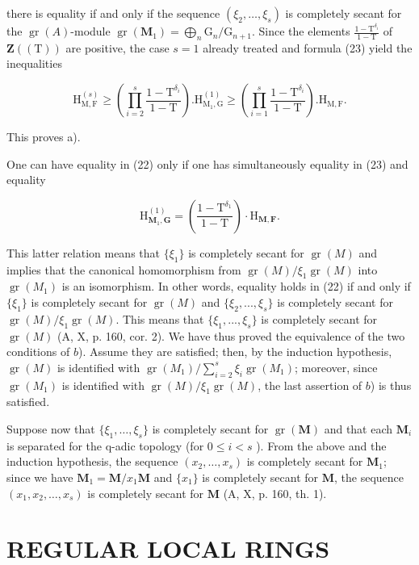 there is equality if and only if the sequence \((\xi_{2}, \ldots, \xi_{s})\) is completely secant for the \(\operatorname{gr}(A)\)-module \(\operatorname{gr}(\mathbf{M}_{1}) = \bigoplus_{n} \mathrm{G}_{n}/\mathrm{G}_{n+1}\). Since the elements \(\frac{1 - \mathrm{T}^{\delta_{i}}}{1 - \mathrm{T}}\) of \(\mathbf{Z}((\mathrm{T}))\) are positive, the case \(s = 1\) already treated and formula (23) yield the inequalities

\[
\mathrm{H} _ {\mathrm{M}, \mathrm{F}} ^ {(s)} \geqslant \left(\prod_ {i = 2} ^ {s} \frac {1 - \mathrm{T} ^ {\delta_ {i}}}{1 - \mathrm{T}}\right). \mathrm{H} _ {\mathrm{M} _ {1}, \mathrm{G}} ^ {(1)} \geqslant \left(\prod_ {i = 1} ^ {s} \frac {1 - \mathrm{T} ^ {\delta_ {i}}}{1 - \mathrm{T}}\right). \mathrm{H} _ {\mathrm{M}, \mathrm{F}}.\tag{24}
\]

This proves a).

One can have equality in (22) only if one has simultaneously equality in (23) and equality

\[
\mathrm{H} _ {\mathbf {M} _ {1}, \mathbf {G}} ^ {(1)} = \left(\frac {1 - \mathrm{T} ^ {\delta_ {1}}}{1 - \mathrm{T}}\right) \cdot \mathrm{H} _ {\mathbf {M}, \mathbf {F}}.\tag{25}
\]

This latter relation means that \(\{\xi_{1}\}\) is completely secant for \(\operatorname{gr}(M)\) and implies that the canonical homomorphism from \(\operatorname{gr}(M)/\xi_{1}\operatorname{gr}(M)\) into \(\operatorname{gr}(M_{1})\) is an isomorphism. In other words, equality holds in (22) if and only if \(\{\xi_{1}\}\) is completely secant for \(\operatorname{gr}(M)\) and \(\{\xi_{2}, ..., \xi_{s}\}\) is completely secant for \(\operatorname{gr}(M)/\xi_{1}\operatorname{gr}(M)\). This means that \(\{\xi_{1}, ..., \xi_{s}\}\) is completely secant for \(\operatorname{gr}(M)\) (A, X, p. 160, cor. 2). We have thus proved the equivalence of the two conditions of \(b\)). Assume they are satisfied; then, by the induction hypothesis, \(\operatorname{gr}(M)\) is identified with \(\operatorname{gr}(M_{1})/\sum_{i=2}^{s} \xi_{i}\operatorname{gr}(M_{1})\); moreover, since \(\operatorname{gr}(M_{1})\) is identified with \(\operatorname{gr}(M)/\xi_{1}\operatorname{gr}(M)\), the last assertion of \(b\)) is thus satisfied.

Suppose now that \(\{\xi_1, \ldots, \xi_s\}\) is completely secant for \(\operatorname{gr}(\mathbf{M})\) and that each \(\mathbf{M}_i\) is separated for the q-adic topology (for \(0 \leqslant i < s\) ). From the above and the induction hypothesis, the sequence \((x_2, \ldots, x_s)\) is completely secant for \(\mathbf{M}_1\); since we have \(\mathbf{M}_1 = \mathbf{M}/x_1\mathbf{M}\) and \(\{x_1\}\) is completely secant for \(\mathbf{M}\), the sequence \((x_1, x_2, \ldots, x_s)\) is completely secant for \(\mathbf{M}\) (A, X, p. 160, th. 1).

\section{REGULAR LOCAL RINGS}
